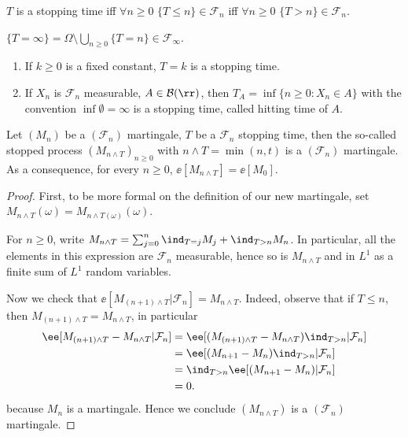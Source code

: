 \documentclass[../main.tex]{subfiles}
\begin{document}
\begin{remark}
    $T$ is a stopping time iff $\forall n \geq 0$ $\{ T \leq n \} \in
    \mathcal{F}_n$ iff $\forall n \geq 0$ $\{ T > n \} \in \mathcal{F}_n $. 

    $\{ T = \infty \} = \Omega \setminus \bigcup_{n \geq 0} \{ T = n \} \in
    \mathcal{F}_{\infty}$.
\end{remark}

\begin{example}
    \hfill
    \begin{enumerate}
      \item If $k \geq 0$ is a fixed constant, $T = k$ is a stopping time.
      \item If $X_n$ is $\mathcal{F}_n$ measurable, $A \in \mathcal{B}(\rr)$,
        then $T_A = \inf \{ n \geq 0 \colon X_n \in A \} $ with the convention
        $\inf \emptyset = \infty$ is a stopping time, called hitting time of
        $A$.
    \end{enumerate}
\end{example}

\begin{lemma}
  Let $(M_n)$ be a $(\mathcal{F}_n)$ martingale, $T$ be a $\mathcal{F}_n$
  stopping time, then the so-called stopped process $(M_{n \wedge T})_{n \geq
  0}$ with $n \wedge T = \min(n, t)$ is a $(\mathcal{F}_n)$ martingale. As a
  consequence, for every $n \geq 0$, $\ee[M_{n \wedge T}] = \ee[M_0]$.
\end{lemma}
\begin{proof}
    First, to be more formal on the definition of our new martingale, set $M_{n
    \wedge T}(\omega) = M_{n \wedge T(\omega)}(\omega)$.

    For $n \geq 0$, write $M_{n \wedge T} = \sum_{j=0}^n \ind_{T = j} M_j +
    \ind_{T > n}M_n$. In particular, all the elements in this expression are
    $\mathcal{F}_n$ measurable, hence so is $M_{n \wedge T}$ and in $L^1$ as a
    finite sum of $L^1$ random variables.

    Now we check that $\ee[M_{(n+1) \wedge T} | \mathcal{F}_n] =  M_{n \wedge
    T}$. Indeed, observe that if $T \leq n$, then $M_{(n+1)\wedge T} = M_{n
    \wedge T}$, in particular
    \begin{align*}
      \ee[M_{(n+1)\wedge T} - M_{n \wedge T} | \mathcal{F}_n]
      &= \ee[(M_{(n+1)\wedge T} - M_{n \wedge T})\ind_{T > n} | \mathcal{F}_n]
      \\
      &= \ee[(M_{n+1} - M_{n})\ind_{T > n} | \mathcal{F}_n] \\
      &= \ind_{T > n}\ee[(M_{n+1} - M_{n})| \mathcal{F}_n]  \\
      &= 0
    .\end{align*} 
    because $M_n$ is a martingale. Hence we conclude $(M_{n \wedge T})$ is a
    $(\mathcal{F}_n)$ martingale.
\end{proof}
\end{document}
